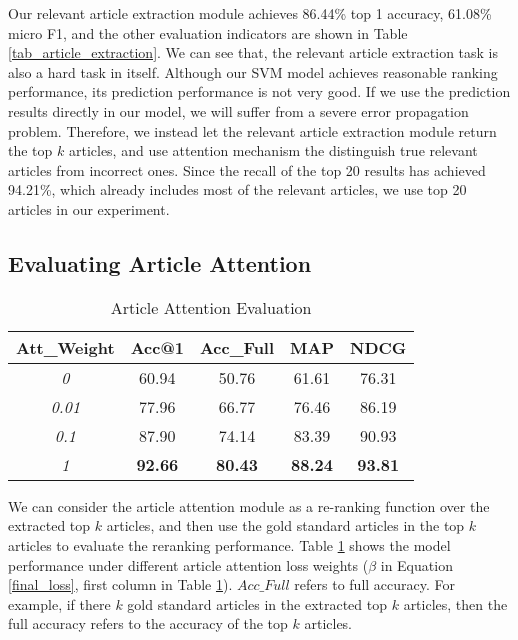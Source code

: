 Our relevant article extraction module achieves 86.44\% top 1 accuracy, 61.08\% micro F1, and the other evaluation indicators are shown in Table \ref{tab_article_extraction}. We can see that, the relevant article extraction task is also a hard task in itself. Although our SVM model achieves reasonable ranking performance, its prediction performance is not very good. If we use the prediction results directly in our model, we will suffer from a severe error propagation problem. Therefore, we instead let the relevant article extraction module return the top $k$ articles, and use attention mechanism the distinguish true relevant articles from incorrect ones. Since the recall of the top 20 results has achieved 94.21\%, which already includes most of the relevant articles, we use top 20 articles in our experiment.

\subsection{Evaluating Article Attention}
\begin{table}
\centering
\normalsize{
\begin{tabular}{|c|c|c|c|c|}
\hline
\textbf{Att\_Weight}			& \textbf{Acc@1} 			& \textbf{Acc\_Full} 			& \textbf{MAP} 			& \textbf{NDCG} \\
\hline
\textit{0} 					& 60.94					& 50.76  					& 61.61 				& 76.31 	\\
\hline
\textit{0.01} 				& 77.96					& 66.77  					& 76.46				& 86.19 	\\
\hline
\textit{0.1} 				& 87.90					& 74.14  					& 83.39				& 90.93 	\\
\hline
\textit{1} 					& \textbf{92.66}				& \textbf{80.43}  			& \textbf{88.24}			& \textbf{93.81} 	\\
\hline
\end{tabular}
}
\caption{Article Attention Evaluation}
\label{tab_article_att}
\end{table}

We can consider the article attention module as a re-ranking function over the extracted top $k$ articles, and then use the gold standard articles in the top $k$ articles to evaluate the reranking performance. Table \ref{tab_article_att} shows the model performance under different article attention loss weights ($\beta$ in Equation \ref{final_loss}, first column in Table \ref{tab_article_att}). $Acc\_Full$ refers to full accuracy. For example, if there $k$ gold standard articles in the extracted top $k$ articles, then the full accuracy refers to the accuracy of the top $k$ articles.

